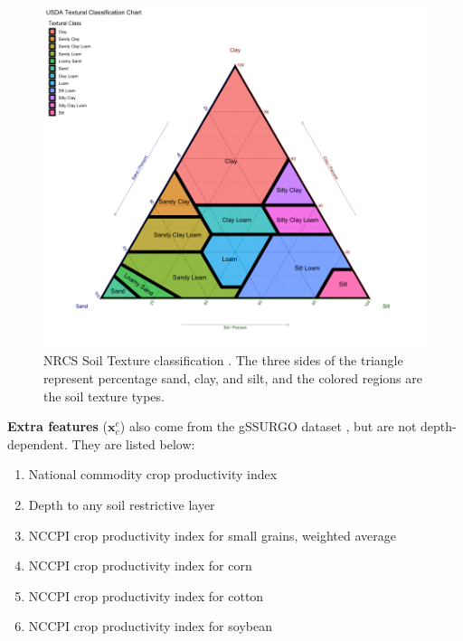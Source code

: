 \begin{figure}[bt]
\centering
\includegraphics[width=0.95\columnwidth]{figs/soil_triangle.png}
\caption{NRCS Soil Texture classification \cite{soiltexture}. The three sides of the triangle represent percentage sand, clay, and silt, and the colored regions are the soil texture types.}
\label{soil_triangle}
\end{figure}

\textbf{Extra features} ($\mathbf{x}_{c}^e$) also come from the gSSURGO dataset \cite{soil2019gridded}, but are not depth-dependent. They are listed below:

\begin{enumerate}
    \item National commodity crop productivity index
    \item Depth to any soil restrictive layer
    \item NCCPI crop productivity index for small grains, weighted average
    \item NCCPI crop productivity index for corn
    \item NCCPI crop productivity index for cotton
    \item NCCPI crop productivity index for soybean
\end{enumerate}




